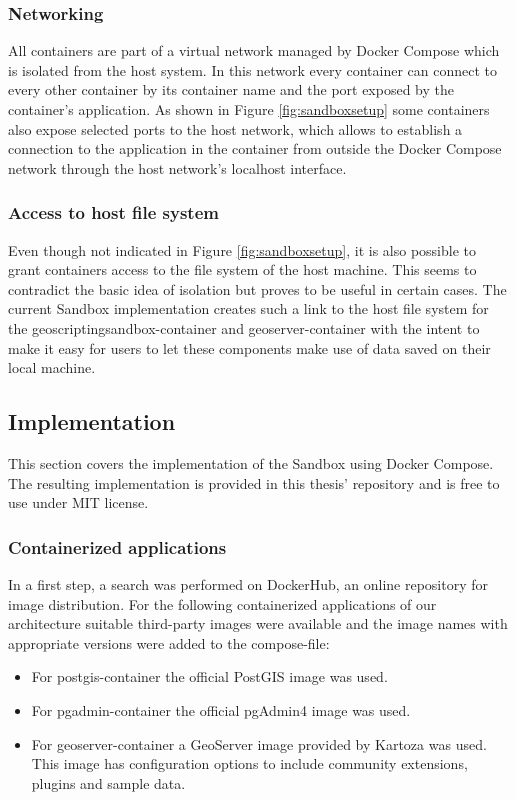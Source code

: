 \documentclass[11pt, a4paper, oneside, parskip=full-]{scrartcl}
\begin{document}
\subsubsection*{Networking}
All containers are part of a virtual network managed by Docker Compose which is
isolated from the host system. In this network every container can connect to
every other container by its container name and the port exposed by the
container's application. As shown in Figure \ref{fig:sandboxsetup} some
containers also expose selected ports to the host network, which allows to
establish a connection to the application in the container from outside the
Docker Compose network through the host network's localhost interface.

\subsubsection*{Access to host file system}
Even though not indicated in Figure \ref{fig:sandboxsetup}, it is also possible
to grant containers access to the file system of the host machine. This seems to
contradict the basic idea of isolation but proves to be useful in certain cases.
The current Sandbox implementation creates such a link to the host file system
for the geoscriptingsandbox-container and geoserver-container with the intent to
make it easy for users to let these components make use of data saved on their
local machine.

\subsection{Implementation}

This section covers the implementation of the Sandbox using Docker Compose. The
resulting implementation is provided in this thesis'
repository\cite{osgeostacksandbox} and is free to use under MIT license.

\subsubsection*{Containerized applications}
In a first step, a search was performed on DockerHub\cite{dockerhub}, an online
repository for image distribution. For the following containerized applications
of our architecture suitable third-party images were available and the image
names with appropriate versions were added to the compose-file:

\begin{itemize}
  \item For postgis-container the official PostGIS image was
  used\cite{postgis-container}.
  \item For pgadmin-container the official pgAdmin4 image was
  used\cite{pgadmin-container}.
  \item For geoserver-container a GeoServer image provided by Kartoza was
  used\cite{geoserver-container}. This image has configuration options to
  include community extensions, plugins and sample data.
\end{itemize}
\end{document}
